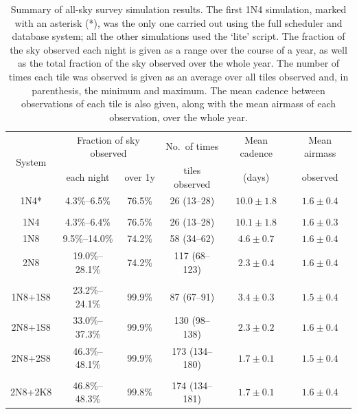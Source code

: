 \begin{colsection}
\begin{colsection}
\begin{table}[t]
    \begin{center}
        \begin{tabular}{c|cc|c|c|c} %
            \multirow{2}{*}{System} &
            \multicolumn{2}{c|}{Fraction of sky observed} &
            No.\ of times &
            Mean cadence &
            {\small Mean airmass}
            \\
            &
            each night &
            over 1y &
            tiles observed &
            (days) &
            observed
            \\
            \midrule
            1N4* & 4.3\%--6.5\% & 76.5\% & 26 (13--28) & $10.0\pm1.8$ & $1.6\pm0.4$ \\
            &&&&&\\
            1N4 & 4.3\%--6.4\% & 76.5\% & 26 (13--28) & $10.1\pm1.8$ & $1.6\pm0.3$ \\
            1N8 & 9.5\%--14.0\% & 74.2\% & 58 (34--62) & $4.6\pm0.7$ & $1.6\pm0.4$ \\
            2N8 & 19.0\%--28.1\% & 74.2\% & 117 (68--123) & $2.3\pm0.4$ & $1.6\pm0.4$ \\
            &&&&&\\
            1N8+1S8 & 23.2\%--24.1\% & 99.9\% & 87 (67--91) & $3.4\pm0.3$ & $1.5\pm0.4$ \\
            2N8+1S8 & 33.0\%--37.3\% & 99.9\% & 130 (98--138) & $2.3\pm0.2$ & $1.6\pm0.4$ \\
            2N8+2S8 & 46.3\%--48.1\% & 99.9\% & 173 (134--180) & $1.7\pm0.1$ & $1.5\pm0.4$ \\
            &&&&&\\
            2N8+2K8 & 46.8\%--48.3\% & 99.8\% & 174 (134--181) & $1.7\pm0.1$ & $1.6\pm0.4$ \\
        \end{tabular}
    \end{center}
    \caption[All-sky survey simulation results summary table]{
        Summary of all-sky survey simulation results. The first 1N4 simulation, marked with an asterisk (*), was the only one carried out using the full scheduler and database system; all the other simulations used the `lite' script. The fraction of the sky observed each night is given as a range over the course of a year, as well as the total fraction of the sky observed over the whole year. The number of times each tile was observed is given as an average over all tiles observed and, in parenthesis, the minimum and maximum. The mean cadence between observations of each tile is also given, along with the mean airmass of each observation, over the whole year.
    }\label{tab:survey_sim_results}
\end{table}
\end{colsection}


\end{colsection}
